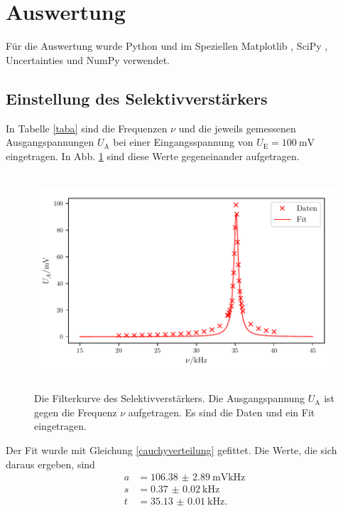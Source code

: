 \section{Auswertung}
\label{sec:Auswertung}

Für die Auswertung wurde Python und im Speziellen Matplotlib \cite{matplotlib}, SciPy \cite{scipy},
Uncertainties \cite{uncertainties} und NumPy \cite{numpy} verwendet.

\subsection{Einstellung des Selektivverstärkers}
In Tabelle \ref{taba} sind die Frequenzen $\nu$ und die jeweils gemessenen Ausgangspannungen $U_\text{A}$ 
bei einer Eingangsspannung von $U_\text{E} = \SI{100}{\milli\volt}$ eingetragen. 
In Abb. \ref{plota} sind diese Werte gegeneinander aufgetragen.



\begin{figure}
    \centering
    \includegraphics[width=15cm, height=8cm]{build/plota2.pdf} %
    \caption{Die Filterkurve des Selektivverstärkers. Die Ausgangspannung $U_\text{A}$
    ist gegen die Frequenz $\nu$ aufgetragen. Es sind die Daten und ein Fit eingetragen.}
    \label{plota}
\end{figure}

\noindent Der Fit wurde mit Gleichung \eqref{cauchyverteilung} gefittet. Die Werte, die sich daraus ergeben, sind
\begin{align*} 
  a &= \SI{106.38(289)}{\milli\volt\kilo\hertz} \\
  s &= \SI{0.37(2)}{\kilo\hertz} \\
  t &= \SI{35.13(1)}{\kilo\hertz}. 
\end{align*}


